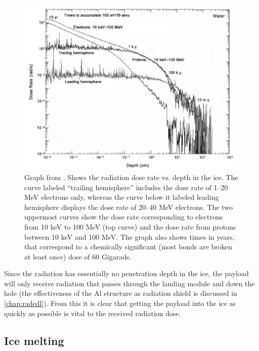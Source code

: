 \begin{figure}[htb]
\begin{center}
\includegraphics[scale=0.7]{figures/navtheory/icerad}
\caption{Graph from \cite{Paranicas_2009}. Shows the radiation dose rate vs. depth in the ice. The curve labeled “trailing hemisphere” includes the dose rate of 1–20 MeV electrons only, whereas the curve below it labeled leading hemisphere displays the dose rate of 20–40 MeV electrons. The two uppermost curves show the dose rate corresponding to electrons from 10 keV to 100 MeV (top curve) and the dose rate from protons between 10 keV and 100 MeV. The graph also shows times in years, that correspond to a chemically significant (most bonds
are broken at least once) dose of 60 Gigarads.}
\label{icerad}
\end{center}
\end{figure}

Since the radiation has essentially no penetration depth in the ice, the payload will only receive radiation that passes through the landing module and down the hole (the effectiveness of the Al structure as radiation shield is discussed in \ref{chap:radedl}). From this it is clear that getting the payload into the ice as quickly as possible is vital to the received radiation dose. 


\subsection{Ice melting}

